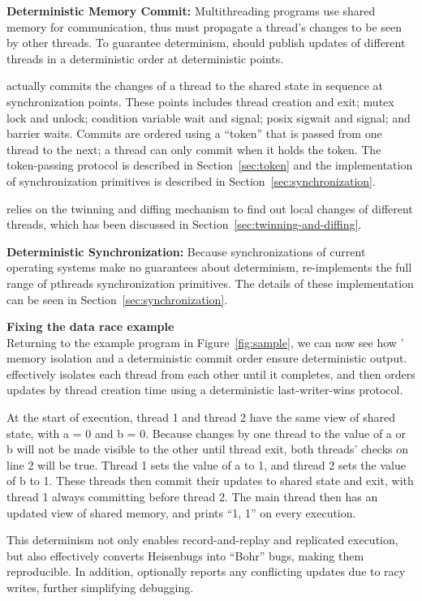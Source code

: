 \textbf{Deterministic Memory Commit:} 
Multithreading programs use shared memory for communication, thus \dthreads{} must propagate a thread's changes to be seen by other threads. To guarantee determinism, \dthreads{} should publish updates of different threads in a deterministic order at deterministic points.

\dthreads{} actually commits the changes of a thread to the shared state in sequence at synchronization points. These points includes thread creation and exit; mutex lock and unlock; condition variable wait and signal; posix sigwait and signal; and barrier waits. Commits are ordered using a ``token'' that is passed from one thread to the next; a thread can only commit when it holds the token.  The token-passing protocol is described in Section~\ref{sec:token} and the implementation of synchronization primitives is described in Section~\ref{sec:synchronization}.

\dthreads{} relies on the twinning and diffing mechanism to find out local changes of different threads, which has been discussed in Section~\ref{sec:twinning-and-diffing}. 

\textbf{Deterministic Synchronization:}
Because synchronizations of current operating systems make no guarantees about determinism,\dthreads{} re-implements the full range of pthreads synchronization primitives. The details of these implementation can be seen in Section~\ref{sec:synchronization}. 


\textbf{Fixing the data race example} \\
Returning to the example program in Figure~\ref{fig:sample}, we can now see how \dthreads{}’ memory isolation and a deterministic commit
order ensure deterministic output. \dthreads{} effectively isolates
each thread from each other until it completes, and then orders
updates by thread creation time using a deterministic last-writer-wins protocol.

At the start of execution, thread 1 and thread 2 have the same
view of shared state, with a = 0 and b = 0. Because changes by
one thread to the value of a or b will not be made visible to the
other until thread exit, both threads’ checks on line 2 will be true. Thread 1 sets the value of a to 1, and thread 2 sets the value of b to 1. These threads then commit their updates to shared state and exit, with thread 1 always committing before thread 2. The main thread then has an updated view of shared memory, and prints “1, 1” on every execution.

This determinism not only enables record-and-replay and replicated
execution, but also effectively converts Heisenbugs into
“Bohr” bugs, making them reproducible. In addition, \dthreads{}
optionally reports any conflicting updates due to racy writes, further simplifying debugging.
